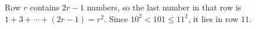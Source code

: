 Row $r$ contains $2r-1$ numbers, so the last number in that row is $1+3+\cdots+(2r-1)=r^2$. Since $10^2<101\le11^2$, it lies in row $\boxed{11}$.

